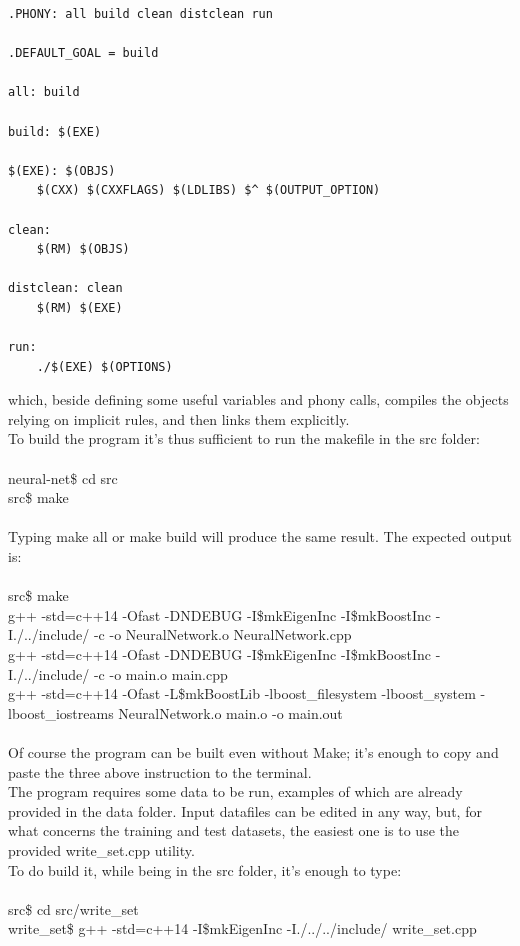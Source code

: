 \documentclass[12pt, a4paper]{report}
\theoremstyle{definition}
\begin{document}
{\begin{lstlisting}[frame=single]
.PHONY: all build clean distclean run

.DEFAULT_GOAL = build

all: build

build: $(EXE)

$(EXE): $(OBJS)
	$(CXX) $(CXXFLAGS) $(LDLIBS) $^ $(OUTPUT_OPTION)

clean:
	$(RM) $(OBJS)

distclean: clean
	$(RM) $(EXE)

run:
	./$(EXE) $(OPTIONS)
\end{lstlisting}
which, beside defining some useful variables and phony calls, compiles the objects relying on implicit rules, and then links them explicitly.\\
To build the program it's thus sufficient to run the makefile in the src folder:\\
{\\ \ttfamily 
	neural-net\$ cd src\\
	src\$ make\\
	\\}
Typing {\ttfamily make all} or {\ttfamily make build} will produce the same result. The expected output is:\\
{\\ \ttfamily 
 src\$ make \\
g++ -std=c++14 -Ofast -DNDEBUG -I\$mkEigenInc -I\$mkBoostInc -I./../include/  -c -o NeuralNetwork.o NeuralNetwork.cpp\\
g++ -std=c++14 -Ofast -DNDEBUG -I\$mkEigenInc -I\$mkBoostInc -I./../include/  -c -o main.o main.cpp\\
g++ -std=c++14 -Ofast -L\$mkBoostLib -lboost\_filesystem -lboost\_system -lboost\_iostreams NeuralNetwork.o main.o -o main.out\\
	\\}
Of course the program can be built even without Make; it's enough to copy and paste the three above instruction to the terminal.\\
The program requires some data to be run, examples of which are already provided in the data folder. Input datafiles can be edited in any way, but, for what concerns the training and test datasets, the easiest one is to use the provided {\ttfamily write\_set.cpp} utility.\\
To do build it, while being in the src folder, it's enough to type:\\
{\\ \ttfamily 
	src\$ cd src/write\_set\\
	write\_set\$ g++ -std=c++14 -I\$mkEigenInc -I./../../include/ write\_set.cpp\\
}}
\end{document}
